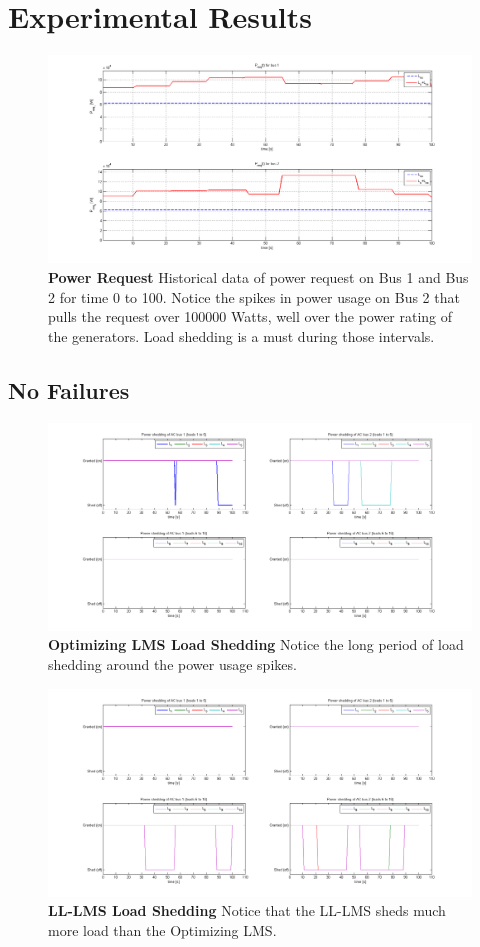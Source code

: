 \documentclass{acm_proc_article-sp}
\begin{document}
\section{Experimental Results}
\begin{figure}[hb]
  \centering
  \includegraphics[width=0.9\columnwidth]{figures/preqnofail.png}
  \caption{\textbf{Power Request}
  Historical data of power request on Bus 1 and Bus 2 for time 0
  to 100. Notice the spikes in power usage on Bus 2 that pulls the
  request over 100000 Watts, well over the power rating of the generators.
  Load shedding is a must during those intervals.}
  \label{fig:preqnofail}
\end{figure}

\subsection{No Failures}
\begin{figure}[ht]
  \centering
  \includegraphics[width=0.9\columnwidth]{figures/lshlnofail.png}
  \caption{\textbf{Optimizing LMS Load Shedding} Notice the long
  period of load shedding around the power usage spikes.}
  \label{fig:lshlnofail}
\end{figure}
\begin{figure}[ht]
  \centering
  \includegraphics[width=0.9\columnwidth]{figures/lsllnofail.png}
  \caption{\textbf{LL-LMS Load Shedding} Notice that the 
  LL-LMS sheds much more load than the Optimizing LMS.}
  \label{fig:lsllnofail}
\end{figure}
\end{document}
